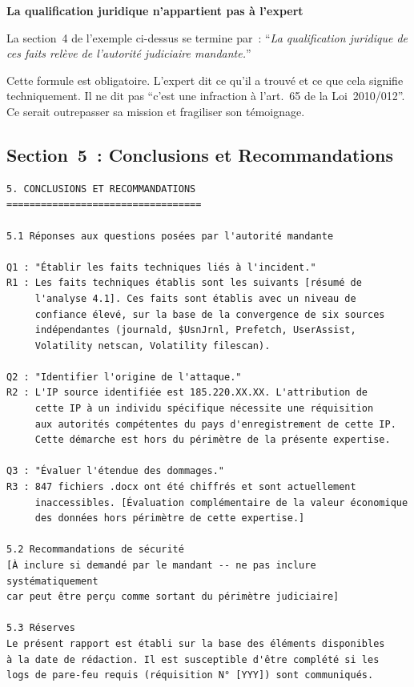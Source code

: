 \begin{boxalert}
\textbf{La qualification juridique n'appartient pas à l'expert}

La section~4 de l'exemple ci-dessus se termine par~:
``\textit{La qualification juridique de ces faits relève de
l'autorité judiciaire mandante.}''

Cette formule est obligatoire. L'expert dit ce qu'il a trouvé
et ce que cela signifie techniquement. Il ne dit pas ``c'est
une infraction à l'art.~65 de la Loi~2010/012''. Ce serait
outrepasser sa mission et fragiliser son témoignage.
\end{boxalert}

\subsection{Section~5~: Conclusions et Recommandations}

\begin{lstlisting}[language=bash_forensique,
    caption={Section Conclusions --- synthèse et recommandations}]
5. CONCLUSIONS ET RECOMMANDATIONS
==================================

5.1 Réponses aux questions posées par l'autorité mandante

Q1 : "Établir les faits techniques liés à l'incident."
R1 : Les faits techniques établis sont les suivants [résumé de
     l'analyse 4.1]. Ces faits sont établis avec un niveau de
     confiance élevé, sur la base de la convergence de six sources
     indépendantes (journald, $UsnJrnl, Prefetch, UserAssist,
     Volatility netscan, Volatility filescan).

Q2 : "Identifier l'origine de l'attaque."
R2 : L'IP source identifiée est 185.220.XX.XX. L'attribution de
     cette IP à un individu spécifique nécessite une réquisition
     aux autorités compétentes du pays d'enregistrement de cette IP.
     Cette démarche est hors du périmètre de la présente expertise.

Q3 : "Évaluer l'étendue des dommages."
R3 : 847 fichiers .docx ont été chiffrés et sont actuellement
     inaccessibles. [Évaluation complémentaire de la valeur économique
     des données hors périmètre de cette expertise.]

5.2 Recommandations de sécurité
[À inclure si demandé par le mandant -- ne pas inclure systématiquement
car peut être perçu comme sortant du périmètre judiciaire]

5.3 Réserves
Le présent rapport est établi sur la base des éléments disponibles
à la date de rédaction. Il est susceptible d'être complété si les
logs de pare-feu requis (réquisition N° [YYY]) sont communiqués.
\end{lstlisting}

